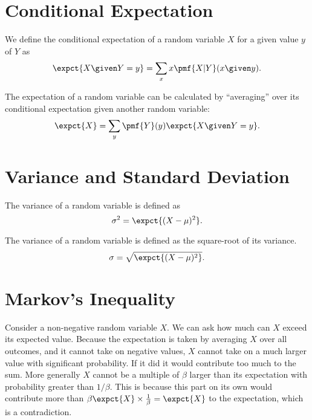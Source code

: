 \section{Conditional Expectation}
\begin{definition}
We define the conditional expectation of a random variable $X$ for a
given value $y$ of $Y$ as 
\[
\expct{X \given Y = y} = \sum_{x}{x \pmf{X | Y}(x \given y)}.
\]
\end{definition}

\begin{theorem}
\label{thm:probability::expectation::tet}
The expectation of a random variable can be calculated by
``averaging'' over its conditional expectation given another random
variable:
\[
\expct{X} = \sum_{y}{\pmf{Y}(y) \expct{X \given Y = y}}.
\]
\end{theorem}

\section{Variance and Standard Deviation}
\begin{definition}[Variance]
\label{def:probability::variance}
The variance of a random variable is defined as 
\[
\sigma^2 = \expct{(X - \mu)^2}.
\]
\end{definition}

\begin{definition}
\label{def:probability::standard-deviation}
The variance of a random variable is defined as the square-root of its variance.
\[
\sigma = \sqrt{\expct{(X - \mu)^2}}.
\]
\end{definition}


\section{Markov's Inequality}
\label{sec:probability::expectation::markov}

\begin{gram}
Consider a non-negative random variable $X$.  We can ask how much can
$X$ exceed its expected value.  Because the expectation is taken by
averaging $X$ over all outcomes, and it cannot take on negative
values, $X$ cannot take on a much larger value with significant
probability.  If it did it would contribute too much to the sum.
%
More generally $X$ cannot be a multiple of $\beta$ larger than its
expectation with probability greater than $1/\beta$.  This is because
this part on its own would contribute more than $\beta \expct{X}
\times \frac{1}{\beta} = \expct{X}$ to the expectation, which is a
contradiction.  
\end{gram}

